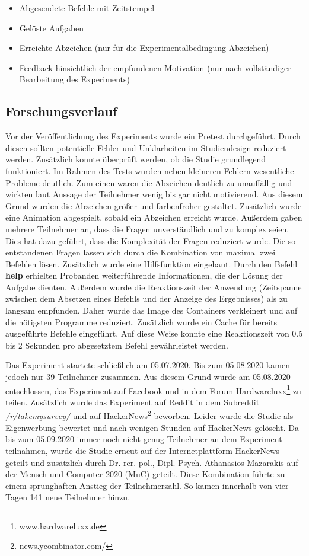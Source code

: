 \begin{itemize}
	 \item Abgesendete Befehle mit Zeitstempel
	 \item Gelöste Aufgaben 
	 \item Erreichte Abzeichen (nur für die Experimentalbedingung Abzeichen)
	 \item Feedback hinsichtlich der empfundenen Motivation (nur nach vollständiger Bearbeitung des Experiments)
\end{itemize}


\subsection{Forschungsverlauf}\label{verlauf}
Vor der Veröffentlichung des Experiments wurde ein Pretest durchgeführt. Durch diesen sollten potentielle Fehler und Unklarheiten im Studiendesign reduziert werden. Zusätzlich konnte überprüft werden, ob die Studie grundlegend funktioniert. Im Rahmen des Tests wurden neben kleineren Fehlern wesentliche Probleme deutlich. Zum einen waren die Abzeichen deutlich zu unauffällig und wirkten laut Aussage der Teilnehmer wenig bis gar nicht motivierend. Aus diesem Grund wurden die Abzeichen größer und farbenfroher gestaltet. Zusätzlich wurde eine Animation abgespielt, sobald ein Abzeichen erreicht wurde. Außerdem gaben mehrere Teilnehmer an, dass die Fragen unverständlich und zu komplex seien. Dies hat dazu geführt, dass die Komplexität der Fragen reduziert wurde. Die so entstandenen Fragen lassen sich durch die Kombination von maximal zwei Befehlen lösen. Zusätzlich wurde eine Hilfsfunktion eingebaut. Durch den Befehl \textbf{help} erhielten Probanden weiterführende Informationen, die der Lösung der Aufgabe dienten. Außerdem wurde die Reaktionszeit der Anwendung (Zeitspanne zwischen dem Absetzen eines Befehls und der Anzeige des Ergebnisses) als zu langsam empfunden. Daher wurde das Image des Containers verkleinert und auf die nötigsten Programme reduziert. Zusätzlich wurde ein Cache für bereits ausgeführte Befehle eingeführt. Auf diese Weise konnte eine Reaktionszeit von 0.5 bis 2 Sekunden pro abgesetztem Befehl gewährleistet werden.

Das Experiment startete schließlich am 05.07.2020. Bis zum 05.08.2020 kamen jedoch nur 39 Teilnehmer zusammen. Aus diesem Grund wurde am 05.08.2020 entschlossen, das Experiment auf Facebook und in dem Forum Hardwareluxx\footnote{www.hardwareluxx.de} zu teilen. Zusätzlich wurde das Experiment auf Reddit in dem Subreddit \textit{/r/takemysurvey/} und auf HackerNews\footnote{news.ycombinator.com/} beworben. Leider wurde die Studie als Eigenwerbung bewertet und nach wenigen Stunden auf HackerNews gelöscht. Da bis zum 05.09.2020 immer noch nicht genug Teilnehmer an dem Experiment teilnahmen, wurde die Studie erneut auf der Internetplattform HackerNews geteilt und zusätzlich durch Dr. rer. pol., Dipl.-Psych. Athanasios Mazarakis auf der Mensch und Computer 2020 (MuC) geteilt. Diese Kombination führte zu einem sprunghaften Anstieg der Teilnehmerzahl. So kamen innerhalb von vier Tagen 141 neue Teilnehmer hinzu.

